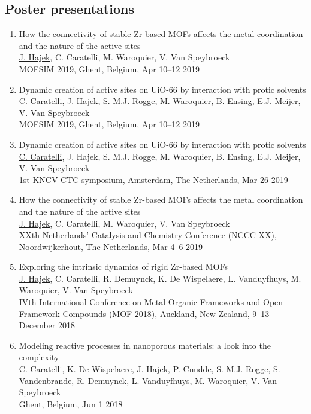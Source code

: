 \subsection*{Poster presentations}
\begin{enumerate}

\item 
How the connectivity of stable Zr-based MOFs affects the metal coordination and the nature of the active sites\\
\underline{J. Hajek}, C. Caratelli, M. Waroquier, V. Van Speybroeck\\
MOFSIM 2019, Ghent, Belgium, Apr 10--12 2019

\item 
Dynamic creation of active sites on UiO-66 by interaction with protic solvents\\
\underline{C. Caratelli}, J. Hajek, S. M.J. Rogge, M. Waroquier, B. Ensing, E.J. Meijer, V. Van Speybroeck\\
MOFSIM 2019, Ghent, Belgium, Apr 10--12 2019

\item
Dynamic creation of active sites on UiO-66 by interaction with protic solvents\\
\underline{C. Caratelli}, J. Hajek, S. M.J. Rogge, M. Waroquier, B. Ensing, E.J. Meijer, V. Van Speybroeck\\
1st KNCV-CTC symposium, Amsterdam, The Netherlands, Mar 26 2019

\item
How the connectivity of stable Zr-based MOFs affects the metal coordination and the nature of the active sites\\
\underline{J. Hajek}, C. Caratelli, M. Waroquier, V. Van Speybroeck\\
XXth Netherlands' Catalysis and Chemistry Conference (NCCC XX), Noordwijkerhout, The Netherlands, Mar 4--6 2019

\item
Exploring the intrinsic dynamics of rigid Zr-based MOFs\\
\underline{J. Hajek}, C. Caratelli, R. Demuynck, K. De Wispelaere, L. Vanduyfhuys, M. Waroquier, V. Van Speybroeck\\
IVth International Conference on Metal-Organic Frameworks and Open Framework Compounds (MOF 2018),
Auckland, New Zealand, 9--13 December 2018

\item
Modeling reactive processes in nanoporous materials: a look into the complexity\\
\underline{C. Caratelli}, K. De Wispelaere, J. Hajek, P. Cnudde, S. M.J. Rogge, S. Vandenbrande, R. Demuynck, L. Vanduyfhuys, M. Waroquier, V. Van Speybroeck\\
Ghent, Belgium, Jun 1 2018


\end{enumerate}
